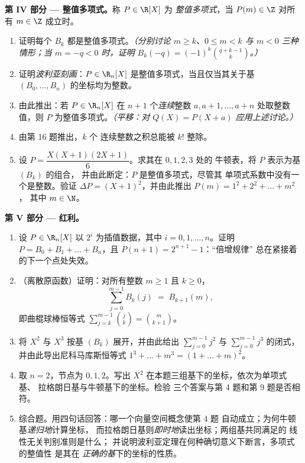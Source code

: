 \begin{problem}
\medskip
\noindent\textbf{第 IV 部分 --- 整值多项式。}称 $P \in \R[X]$ 为
\emph{整值多项式}，当 $P(m) \in
\Z$ 对所有 $m \in \Z$ 成立时。
\begin{enumerate}[resume]
  \item 证明每个 $B_k$ 都是整值多项式。\emph{（分别讨论 $m
        \geq k$、$0 \leq m < k$ 与 $m < 0$ 三种情形；当 $m =
        -q < 0$ 时，证明 $B_k(-q) = (-1)^k \binom{q + k - 1}{k}$。）}
  \item 证明\emph{波利亚刻画}：$P \in \R_n[X]$
        是整值多项式，当且仅当其关于基
        $(B_0, \dots, B_n)$ 的坐标均为整数。
  \item 由此推出：若 $P \in \R_n[X]$ 在 $n + 1$
        个\emph{连续}整数 $a, a+1, \dots, a+n$ 处取整数值，则 $P$
        为整值多项式。\emph{（平移：对 $Q(X)
        = P(X + a)$ 应用上述讨论。）}
  \item 由第 16 题推出，$k$ 个
        连续整数之积总能被 $k!$ 整除。
  \item 设 $P = \dfrac{X(X+1)(2X+1)}{6}$。求其在 $0, 1, 2, 3$ 处的
        牛顿表，将 $P$ 表示为基 $(B_k)$ 的组合，
        并由此断定：$P$ 是整值多项式，尽管其
        单项式系数中没有一个是整数。验证 $\Delta P =
        (X+1)^2$，并由此推出 $P(m) = 1^2 + 2^2 + \dots + m^2$，
        其中 $m \in \N$。
\end{enumerate}

\medskip
\noindent\textbf{第 V 部分 --- 红利。}
\begin{enumerate}[resume]
  \item 设 $P \in \R_n[X]$ 以 $2^i$ 为插值数据，其中 $i =
        0, 1, \dots, n$。证明 $P = B_0 + B_1 + \dots + B_n$，且
        $P(n + 1) = 2^{n+1} - 1$：“倍增规律”
        总在紧接着的下一个点处失效。
  \item （离散原函数）证明：对所有整数 $m
        \geq 1$ 且 $k \geq 0$，
        \[
        \sum_{j=0}^{m-1} B_k(j) \;=\; B_{k+1}(m),
        \]
        即曲棍球棒恒等式 $\sum_{j=k}^{m-1}
        \binom{j}{k} = \binom{m}{k+1}$。
  \item 将 $X^2$ 与 $X^3$ 按基 $(B_k)$ 展开，并由此给出
        $\sum_{j=0}^{m-1} j^2$ 与
        $\sum_{j=0}^{m-1} j^3$ 的闭式，并由此导出尼科马库斯恒等式
        $1^3 + \dots + m^3 = (1 + \dots + m)^2$。
  \item 取 $n = 2$，节点为 $0, 1, 2$。写出
        $X^2$ 在本题三组基下的坐标，依次为单项式基、
        拉格朗日基与牛顿基下的坐标。检验
        三个答案与第 4 题和第 9 题是否相符。
  \item 综合题。用四句话回答：哪一个向量空间概念使第 4 题
        自动成立；为何牛顿基\emph{递归地}计算坐标，
        而拉格朗日基则\emph{即时地}读出坐标；两组基共同满足的
        线性无关判别准则是什么；
        并说明波利亚定理在何种确切意义下断言，多项式的整值性
        是其在
        \emph{正确的基}下的坐标的性质。
\end{enumerate}
\end{problem}
